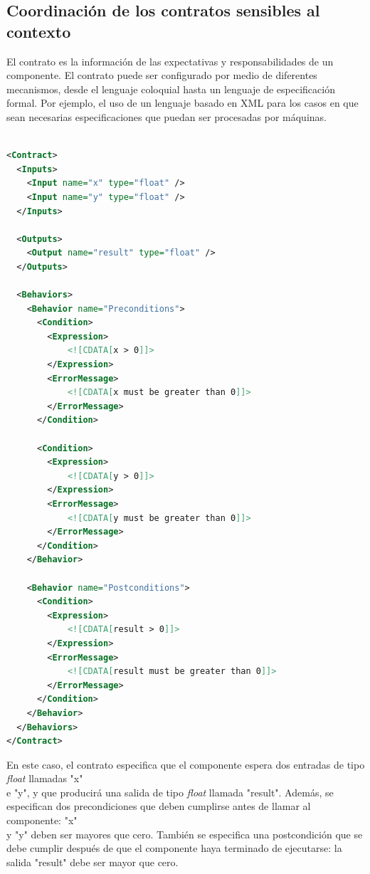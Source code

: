 \begin{itemize}
\subsection{Coordinación de los contratos sensibles al contexto}

El contrato es la información de las expectativas y responsabilidades de un componente. El contrato puede ser configurado por medio de diferentes mecanismos, desde el lenguaje coloquial hasta un lenguaje de especificación formal. Por ejemplo, el uso de un lenguaje basado en XML para los casos en que sean necesarias especificaciones que puedan ser procesadas por máquinas. 


\begin{lstlisting}[language=XML]
    
<Contract>
  <Inputs>
    <Input name="x" type="float" />
    <Input name="y" type="float" />
  </Inputs>

  <Outputs>
    <Output name="result" type="float" />
  </Outputs>
  
  <Behaviors>
    <Behavior name="Preconditions">
      <Condition>
        <Expression>
            <![CDATA[x > 0]]>
        </Expression>
        <ErrorMessage>
            <![CDATA[x must be greater than 0]]>
        </ErrorMessage>
      </Condition>
      
      <Condition>
        <Expression>
            <![CDATA[y > 0]]>
        </Expression>
        <ErrorMessage>
            <![CDATA[y must be greater than 0]]>
        </ErrorMessage>
      </Condition> 
    </Behavior>
  
    <Behavior name="Postconditions">
      <Condition>
        <Expression>
            <![CDATA[result > 0]]>
        </Expression>
        <ErrorMessage>
            <![CDATA[result must be greater than 0]]>
        </ErrorMessage>
      </Condition>
    </Behavior>
  </Behaviors>
</Contract>

\end{lstlisting}



En este caso, el contrato especifica que el componente espera dos entradas de tipo \textit{float} llamadas "x" \\e "y", y que producirá una salida de tipo \textit{float} llamada "result". Además, se especifican dos precondiciones que deben cumplirse antes de llamar al componente: "x" \\y "y" deben ser mayores que cero. También se especifica una postcondición que se debe cumplir después de que el componente haya terminado de ejecutarse: la salida "result" debe ser mayor que cero.



\end{itemize}
